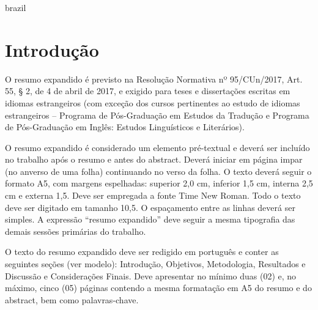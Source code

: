 

\makeatletter


\ifenglish

    \cleardoublepage{}

    \begin{otherlanguage*}{brazil}
        \setlength{\parskip}{0.2cm}
        \setlength{\parindent}{0.0cm}

        \section*{Introdução}
        O resumo expandido é previsto na Resolução Normativa nº 95/CUn/2017, Art. 55, § 2, de 4 de
        abril de 2017, e exigido para teses e dissertações escritas em idiomas estrangeiros (com
        exceção dos cursos pertinentes ao estudo de idiomas estrangeiros – Programa de Pós-Graduação
        em Estudos da Tradução e Programa de Pós-Graduação em Inglês: Estudos Linguísticos e
        Literários).

        O resumo expandido é considerado um elemento pré-textual e deverá ser incluído no trabalho
        após o resumo e antes do abstract. Deverá iniciar em página impar (no anverso de uma folha)
        continuando no verso da folha. O texto deverá seguir o formato A5, com margens espelhadas:
        superior 2,0 cm, inferior 1,5 cm, interna 2,5 cm e externa 1,5. Deve ser empregada a fonte
        Time New Roman.  Todo o texto deve ser digitado em tamanho 10,5. O espaçamento entre as
        linhas deverá ser simples. A expressão “resumo expandido” deve seguir a mesma tipografia das
        demais sessões primárias do trabalho.

        O texto do resumo expandido deve ser redigido em português e conter as seguintes seções (ver
        modelo): Introdução, Objetivos, Metodologia, Resultados e Discussão e Considerações Finais.
        Deve apresentar no mínimo duas (02) e, no máximo, cinco (05) páginas contendo a mesma
        formatação em A5 do resumo e do abstract, bem como palavras-chave.


\end{otherlanguage*}
